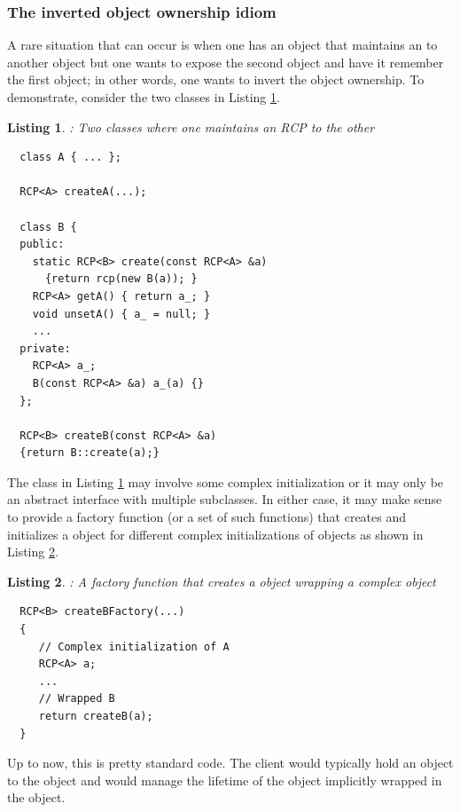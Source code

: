 \documentclass[pdf,ps2pdf,11pt]{SANDreport}
\newtheorem{listing}{Listing}
\begin{document}
%
{}\subsubsection{The inverted object ownership idiom}
\label{sec:inverting-obj-ownership}
%

A rare situation that can occur is when one has an object that
maintains an {} to another object but one wants to expose the
second object and have it remember the first object; in other words,
one wants to invert the object ownership.  To demonstrate, consider
the two classes in Listing {}\ref{listing:B_owns_A_decl}.

\begin{listing}: Two classes where one maintains an RCP to the other \\
\label{listing:B_owns_A_decl}
{\small\begin{verbatim}
  class A { ... };

  RCP<A> createA(...);

  class B {
  public:
    static RCP<B> create(const RCP<A> &a)
      {return rcp(new B(a)); }
    RCP<A> getA() { return a_; }
    void unsetA() { a_ = null; }
    ...
  private:
    RCP<A> a_;
    B(const RCP<A> &a) a_(a) {}
  };

  RCP<B> createB(const RCP<A> &a)
  {return B::create(a);}
\end{verbatim}}
\end{listing}

The class {} in Listing {}\ref{listing:B_owns_A_decl} may
involve some complex initialization or it may only be an abstract
interface with multiple subclasses.  In either case, it may make sense
to provide a factory function (or a set of such functions) that
creates and initializes a {} object for different complex
initializations of {} objects as shown in Listing
{}\ref{listing:createBFactory}.

\begin{listing}: A factory function that creates a {} object
wrapping a complex {} object \\
\label{listing:createBFactory}
{\small\begin{verbatim}
  RCP<B> createBFactory(...)
  {
     // Complex initialization of A
     RCP<A> a;
     ...
     // Wrapped B
     return createB(a);
  }
\end{verbatim}}
\end{listing}

Up to now, this is pretty standard code.  The client would typically
hold an {} object to the {} object and would
manage the lifetime of the {} object implicitly wrapped in
the {} object.
\end{document}
